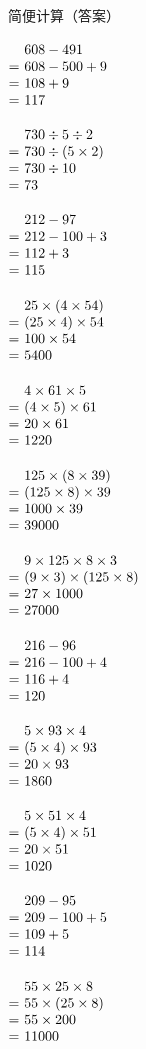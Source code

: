 \documentclass[UTF8]{ctexart}
\makeatletter
\newcommand{\sheettitle}[1]{%
  \noindent\begin{minipage}[t][18mm][t]{\textwidth}%
    \vspace{0pt}\centering\zihao{2}#1\par
  \end{minipage}\par\nointerlineskip
}
\newcommand{\cell}[2]{%
  \begin{minipage}[t][35mm][t]{0.315\textwidth}%
    \vspace{0pt}\linespread{1}#1\selectfont
    \strut#2%
  \end{minipage}%
}
\newcommand{\arow}[3]{%
  \noindent\cell{\zihao{-4}}{#1}\hfill
  \cell{\zihao{-4}}{#2}\hfill
  \cell{\zihao{-4}}{#3}\par\nointerlineskip
}
\newcommand{\eqgap}{0.35em}
\newcommand{\problemline}[1]{#1}
\newcommand{\solution}[1]{%
  \(\begin{array}[t]{@{}r@{\hspace{\eqgap}}l@{}}#1\end{array}\)%
}
\makeatother
\begin{document}
\sheettitle{简便计算（答案）}
\arow
{\solution{
& \problemline{608-491} \\
= & 608-500+9 \\
= & 108+9 \\
= & 117
}}
{\solution{
& \problemline{730\div 5\div 2} \\
= & 730\div (5\times 2) \\
= & 730\div 10 \\
= & 73
}}
{\solution{
& \problemline{212-97} \\
= & 212-100+3 \\
= & 112+3 \\
= & 115
}}
\arow
{\solution{
& \problemline{25\times (4\times 54)} \\
= & (25\times 4)\times 54 \\
= & 100\times 54 \\
= & 5400
}}
{\solution{
& \problemline{4\times 61\times 5} \\
= & (4\times 5)\times 61 \\
= & 20\times 61 \\
= & 1220
}}
{\solution{
& \problemline{125\times (8\times 39)} \\
= & (125\times 8)\times 39 \\
= & 1000\times 39 \\
= & 39000
}}
\arow
{\solution{
& \problemline{9\times 125\times 8\times 3} \\
= & (9\times 3)\times (125\times 8) \\
= & 27\times 1000 \\
= & 27000
}}
{\solution{
& \problemline{216-96} \\
= & 216-100+4 \\
= & 116+4 \\
= & 120
}}
{\solution{
& \problemline{5\times 93\times 4} \\
= & (5\times 4)\times 93 \\
= & 20\times 93 \\
= & 1860
}}
\arow
{\solution{
& \problemline{5\times 51\times 4} \\
= & (5\times 4)\times 51 \\
= & 20\times 51 \\
= & 1020
}}
{\solution{
& \problemline{209-95} \\
= & 209-100+5 \\
= & 109+5 \\
= & 114
}}
{\solution{
& \problemline{55\times 25\times 8} \\
= & 55\times (25\times 8) \\
= & 55\times 200 \\
= & 11000
}}
\end{document}
